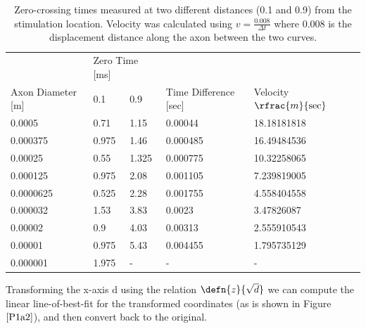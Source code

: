 \documentclass[12pt]{article}
\begin{document}
\begin{table}[h!]
\begin{tabular}{|l|l|l|l|l|}
                  & \multicolumn{2}{l}{Zero Time [ms]} &                     &                     \\
Axon Diameter [m] & 0.1              & 0.9             & Time Difference [sec] & Velocity $\rfrac{m}{\text{sec}}$ \\ \hline\hline
0.0005            & 0.71             & 1.15            & 0.00044             & 18.18181818         \\
0.000375          & 0.975            & 1.46            & 0.000485            & 16.49484536         \\
0.00025           & 0.55             & 1.325           & 0.000775            & 10.32258065         \\
0.000125          & 0.975            & 2.08            & 0.001105            & 7.239819005         \\
0.0000625         & 0.525            & 2.28            & 0.001755            & 4.558404558         \\
0.000032          & 1.53             & 3.83            & 0.0023              & 3.47826087          \\
0.00002           & 0.9              & 4.03            & 0.00313             & 2.555910543         \\
0.00001           & 0.975            & 5.43            & 0.004455            & 1.795735129         \\
0.000001          & 1.975            & -               & -                   & -                  
\end{tabular}
\caption{Zero-crossing times measured at two different distances (0.1 and 0.9) from the stimulation location. Velocity was calculated using $v = \frac{0.008}{\Delta t}$ where 0.008 is the displacement distance along the axon between the two curves. }
\label{table:1}
\end{table}



\par Transforming the x-axis d using the relation $\defn{z}{\sqrt{d}}$ we can compute the linear line-of-best-fit for the transformed coordinates (as is shown in Figure $\ref{P1a2}$), and then convert back to the original.
\end{document}

